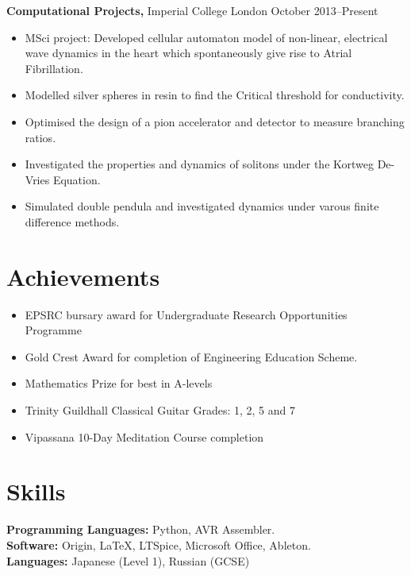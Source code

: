 \documentclass[12pt, margin]{res}
\begin{document}
\begin{resume}
 {\bf Computational Projects,} Imperial College London \hfill October 2013--Present
 \begin{itemize} \itemsep -2pt  %
\item MSci project:  Developed cellular automaton model of non-linear, electrical wave dynamics in the heart which spontaneously give rise to Atrial Fibrillation. 
\item Modelled silver spheres in resin to find the Critical threshold for conductivity.
\item Optimised the design of a pion accelerator and detector to measure branching ratios.
 \item Investigated the properties and dynamics of solitons under the Kortweg De-Vries Equation.
\item Simulated double pendula and investigated dynamics under varous finite difference methods.



 \end{itemize}


\section{Achievements} 
\begin{itemize}\itemsep -2pt
\item EPSRC bursary award for Undergraduate Research Opportunities Programme
\item Gold Crest Award for completion of Engineering Education Scheme.
\item Mathematics Prize for best in A-levels
\item Trinity Guildhall Classical Guitar Grades: 1, 2, 5 and 7
\item Vipassana 10-Day Meditation Course completion

 \end{itemize}

\singlespacing
\section{Skills}
   {\bf Programming Languages:} 
 Python, AVR Assembler.\\
     {\bf Software:} 
 Origin, \LaTeX, LTSpice, Microsoft Office, Ableton.\\
{\bf Languages:}
 Japanese (Level 1), Russian (GCSE)
\singlespacing


\end{resume}
\end{document}
